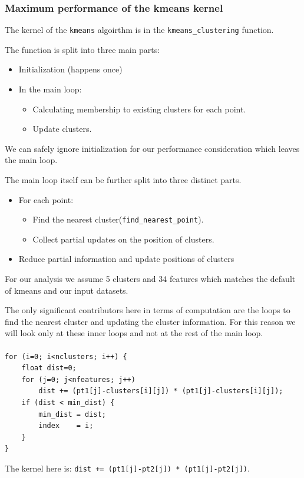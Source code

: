 \subsubsection{Maximum performance of the kmeans kernel}

The kernel of the \texttt{kmeans} algoirthm is in the \texttt{kmeans\_clustering} function.

The function is split into three main parts:
\begin{itemize}
	\item Initialization (happens once)
	\item In the main loop:
	\begin{itemize}
		\item Calculating membership to existing clusters for each point.
		\item Update clusters.
	\end{itemize}
\end{itemize}

We can safely ignore initialization for our performance consideration which leaves the main loop.

The main loop itself can be further split into three distinct parts.
\begin{itemize}
	\item For each point:
	\begin{itemize}
		\item Find the nearest cluster(\texttt{find\_nearest\_point}).
		\item Collect partial updates on the position of clusters.
	\end{itemize}
	\item Reduce partial information and update positions of clusters
\end{itemize}

For our analysis we assume 5 clusters and 34 features which matches
the default of kmeans and our input datasets.

The only significant contributors here in terms of computation are the loops to find the nearest cluster and updating the cluster information.
For this reason we will look only at these inner loops and not at the rest of the main loop.

\paragraph{}
\begin{lstlisting}[caption={Inlined representation of find\_nearest\_point}]
for (i=0; i<nclusters; i++) {
	float dist=0;
	for (j=0; j<nfeatures; j++)
		dist += (pt1[j]-clusters[i][j]) * (pt1[j]-clusters[i][j]);
	if (dist < min_dist) {
		min_dist = dist;
		index    = i;
	}
}
\end{lstlisting}
The kernel here is:
\texttt{dist += (pt1[j]-pt2[j]) * (pt1[j]-pt2[j])}.\newline

